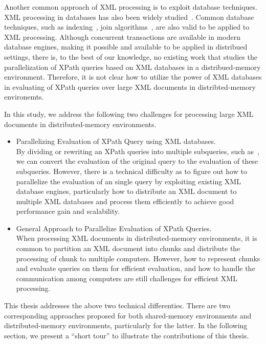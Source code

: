 Another common approach of XML processing is to exploit database techniques. XML
processing in databases has also been widely studied~\cite{fong2001converting,
	meier2002exist, jagadish2002timber,jiang2002xparent,PCSS04}. Common database
techniques, such as indexing~\cite{kha2001xml, wang2005sequencing,
	popovici2005sirius}, join algorithms~\cite{liang2005lax,liang2006slax,
	guha2003index}, are also valid to be applied to XML processing. Although
concurrent transactions are available in modern database engines, making it
possible and available to be applied in distribued settings, there is, to the
best of our knowledge, no existing work that studies the parallelization of
XPath queries based on XML databases in a distribued-memory environment.
Therefore,  it is not clear how to utilize the power of XML databases in
evaluating of XPath queries over large XML documents in distribted-memory
environemts.

In this study, we address the following two challenges for processing large
XML documents in distributed-memory environments.

\begin{itemize} 
	\item Parallelizing Evaluation of XPath Query using XML databases.\\  
	By dividing or rewriting an XPath queries into multiple subqueries, such
	as~\cite{BoLS09,Bord10},  we can convert the evaluation of the original query to
	the evaluation of these subqueries. However, there is a technical difficulty as
	to figure out how to parallelize the evaluation of an single query by exploiting
	existing XML database engines, particularly how to distribute an XML document to 
	multiple XML databases and process them efficiently to achieve good 
	performance gain and scalability.
	
	\item General Approach to Parallelize Evaluation of XPath Queries.\\
	When processing XML documents in distributed-memory environments, it is common
	to partition an XML document into chunks and distribute the processing of chunk
	to multiple computers. However, how to represent chunks and evaluate queries on
	them for efficient evaluation, and how to handle the communication among
	computers are still challenges for efficient XML processing. \end{itemize}

This thesis addresses the above two technical differenties. There are two
corresponding approaches proposed for both shared-memory environments and
distributed-memory environments, particularly for the latter. In the following
section, we present a ``short tour'' to illustrate the contributions of this
thesis.

